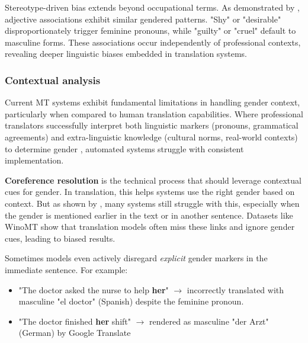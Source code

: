 Stereotype-driven bias extends beyond occupational terms. As demonstrated by \citet{pratesAssessingGenderBias2019}, adjective associations exhibit similar gendered patterns. "Shy" or "desirable" disproportionately trigger feminine pronouns, while "guilty" or "cruel" default to masculine forms. These associations occur independently of professional contexts, revealing deeper linguistic biases embedded in translation systems.

\subsubsection{Contextual analysis} \label{subsection:contextual_analysis}

Current MT systems exhibit fundamental limitations in handling gender context, particularly when compared to human translation capabilities. Where professional translators successfully interpret both linguistic markers (pronouns, grammatical agreements) and extra-linguistic knowledge (cultural norms, real-world contexts) to determine gender \citep{rescignoGenderBiasMachine2023}, automated systems struggle with consistent implementation.

\textbf{Coreference resolution} is the technical process that should leverage contextual cues for gender. In translation, this helps systems use the right gender based on context. But as shown by \citet{choMeasuringGenderBias2019}, many systems still struggle with this, especially when the gender is mentioned earlier in the text or in another sentence. Datasets like WinoMT \citep{stanovskyEvaluatingGenderBias2019} show that translation models often miss these links and ignore gender cues, leading to biased results.

Sometimes models even actively disregard \textit{explicit} gender markers in the immediate sentence. For example:
\begin{itemize}
    \item "The doctor asked the nurse to help \textbf{her}" $\rightarrow$ incorrectly translated with masculine "el doctor" (Spanish) despite the feminine pronoun.
    \item "The doctor finished \textbf{her} shift" $\rightarrow$ rendered as masculine "der Arzt" (German) by Google Translate \citep{stanovskyEvaluatingGenderBias2019}
\end{itemize}

